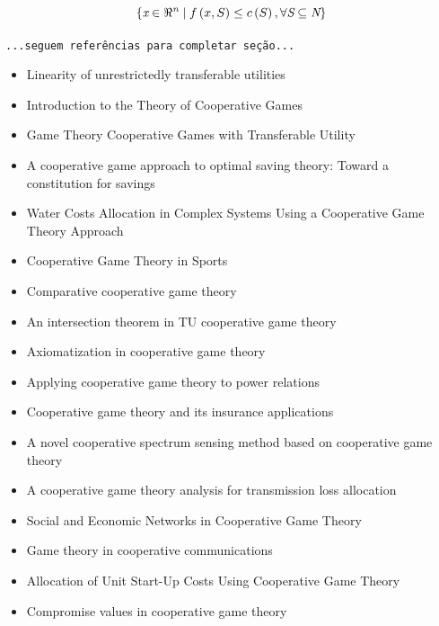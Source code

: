 \documentclass[
	article,			        %
	11pt,				          %
	oneside,			        %
	a4paper,			        %
	english,			        %
	brazil,				        %
	sumario=tradicional
]{abntex2}\usepackage[]{graphicx}\usepackage[]{color}
\begin{document}
\begin{equation}
  \label{eq:conceitoTJC}
  \left \{ 
    \emph{x} \in \Re^{\emph{n}} \mid f\left ( x,S \right ) \leq c\left ( S \right ), \forall \emph{S} \subseteq \emph{N}
  \right\}
\end{equation}

\texttt{\color{red}...seguem referências para completar seção...}

  \begin{itemize}
    \item Linearity of unrestrictedly transferable utilities \cite{Aumann.1960}
    \item Introduction to the Theory of Cooperative Games \cite{Peleg.2007}
    \item Game Theory Cooperative Games with Transferable Utility \cite{Peters.2008}
    \item A cooperative game approach to optimal saving theory: Toward a constitution for savings \cite{Forte.1994}
    \item Water Costs Allocation in Complex Systems Using a Cooperative Game Theory Approach \cite{Sechi.2013}
    \item Cooperative Game Theory in Sports \cite{Manuel.2013}
    \item Comparative cooperative game theory \cite{Ichiishi.1990}
    \item An intersection theorem in TU cooperative game theory \cite{Albeniz.2004}
    \item Axiomatization in cooperative game theory \cite{yakov.2005}
    \item Applying cooperative game theory to power relations \cite{Wiese.2009}
    \item Cooperative game theory and its insurance applications \cite{Lemaire.1993}
    \item A novel cooperative spectrum sensing method based on cooperative game theory \cite{KaitianCao.2010}
    \item A cooperative game theory analysis for transmission loss allocation \cite{Lima.2008}
    \item Social and Economic Networks in Cooperative Game Theory \cite{Ray.2002}
    \item Game theory in cooperative communications \cite{Yang.2012}
    \item Allocation of Unit Start-Up Costs Using Cooperative Game Theory \cite{Hu.2006}
    \item Compromise values in cooperative game theory \cite{Tijs.1993}

\end{itemize}
\end{document}
